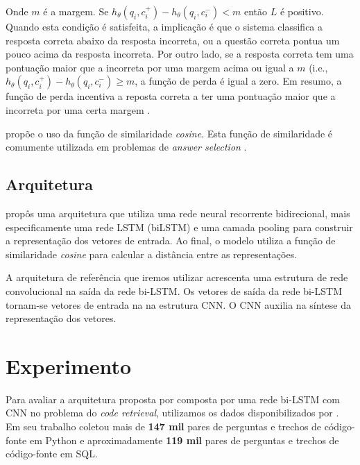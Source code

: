 \documentclass[12pt]{article}
\begin{document}
Onde $m$ é a margem. Se $h_{\theta}(q_{i}, c_{i}^{+}) - h_{\theta}(q_{i}, c_{i}^{-}) < m$ então $L$ é positivo. Quando esta condição é satisfeita, a implicação é que o sistema classifica a resposta correta abaixo da resposta incorreta, ou a questão correta pontua um pouco acima da resposta incorreta. Por outro lado, se a resposta correta tem uma pontuação maior que a incorreta por uma margem acima ou igual a $m$ (i.e., $h_{\theta}(q_{i}, c_{i}^{+}) - h_{\theta}(q_{i}, c_{i}^{-}) \geq m$, a função de perda é igual a zero. Em resumo, a função de perda incentiva a reposta correta a ter uma pontuação maior que a incorreta por uma certa margem \cite{lai-etal-2018-review}.

\cite{tan-lstm-qa} propõe o uso da função de similaridade \textit{cosine}. Esta função de similaridade é comumente utilizada em problemas de \textit{answer selection} \cite{feng-answer-selection-2015}. 

\subsection{Arquitetura}

\cite{tan-lstm-qa} propôs uma arquitetura que utiliza uma rede neural recorrente bidirecional, mais especificamente uma rede LSTM (biLSTM) \cite{hochreiter-Schmidhuber-lstm-1997} e uma camada pooling para construir a representação dos vetores de entrada. Ao final, o modelo utiliza a função de similaridade \textit{cosine} para calcular a distância
entre as representações. 

A arquitetura de referência que iremos utilizar acrescenta uma estrutura de rede convolucional na saída da rede bi-LSTM. Os vetores de saída da rede bi-LSTM tornam-se vetores de entrada na na estrutura CNN. O CNN auxilia na síntese da representação dos vetores.

\section{Experimento}\label{sec:experimento}

Para avaliar a arquitetura proposta por \cite{tan-lstm-qa} composta por uma rede bi-LSTM com CNN no problema do \textit{code retrieval}, utilizamos os dados disponibilizados por \cite{Yao-staqc:2018}. Em seu trabalho \cite{Yao-staqc:2018} coletou mais de \textbf{147 mil} pares de perguntas e trechos de código-fonte em Python e aproximadamente \textbf{119 mil} pares de perguntas e trechos de código-fonte em SQL. 
\end{document}
